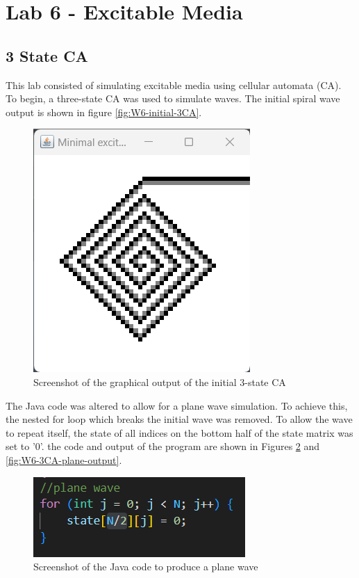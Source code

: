 \newpage
\section{Lab 6 - Excitable Media} 
\subsection{3 State CA}
This lab consisted of simulating excitable media using cellular automata (CA). To begin, a three-state CA was used to simulate waves. The initial spiral wave output is shown in figure \autoref{fig:W6-initial-3CA}.

\begin{figure}[H] 
    \centering
    \includegraphics[width=0.49\columnwidth]{Figures/Week 6/3stateCA-Initial.png}
    \caption{Screenshot of the graphical output of the initial 3-state CA}
    \label{fig:W6-initial-3CA}
\end{figure}

The Java code was altered to allow for a plane wave simulation. To achieve this, the nested for loop which breaks the initial wave was removed. To allow the wave to repeat itself, the state of all indices on the bottom half of the state matrix was set to '0'. the code and output of the program are shown in Figures \ref{fig:W6-3CA-plane-code} and \ref{fig:W6-3CA-plane-output}. 


\begin{figure}[H] 
    \centering
    \includegraphics[width=0.49\columnwidth]{Figures/Week 6/3stateCA-plane-code.png}
    \caption{Screenshot of the Java code to produce a plane wave}
    \label{fig:W6-3CA-plane-code}
\end{figure}

